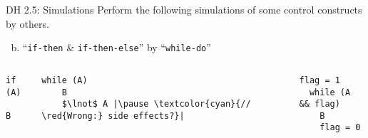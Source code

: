 \begin{frame}[fragile]{}
  \begin{exampleblock}{DH 2.5: Simulations}
    Perform the following simulations of some control constructs by others.
    \begin{enumerate}[(a)]
      \setcounter{enumi}{(1)}
      \item ``\texttt{if-then} \& \texttt{if-then-else}'' by ``\texttt{while-do}''
    \end{enumerate}
  \end{exampleblock}

  \begin{columns}
      \begin{lstlisting}[style = Cstyle, backgroundcolor = \color{teal!10!lightgray}]
  if (A)
    B
      \end{lstlisting}

      \pause
      \begin{lstlisting}[style = Cstyle]
  while (A)
    B
    $\lnot$ A |\pause \textcolor{cyan}{// \red{Wrong:} side effects?}|
      \end{lstlisting}

      \pause
      \begin{lstlisting}[style = Cstyle]
  flag = 1
  while (A && flag)
    B
    flag = 0
      \end{lstlisting}
  \end{columns}
\end{frame}

